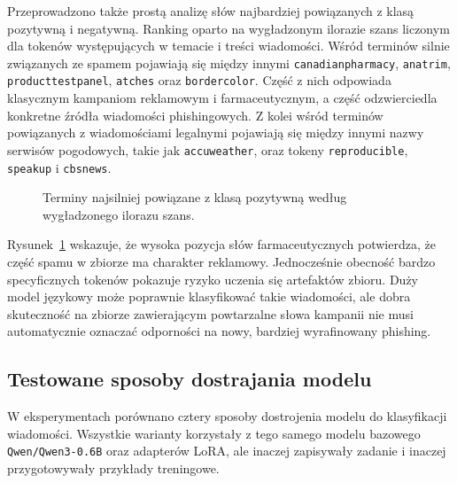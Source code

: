Przeprowadzono także prostą analizę słów najbardziej powiązanych z klasą
pozytywną i negatywną. Ranking oparto na wygładzonym ilorazie szans liczonym
dla tokenów występujących w temacie i treści wiadomości. Wśród terminów silnie
związanych ze spamem pojawiają się między innymi \texttt{canadianpharmacy},
\texttt{anatrim}, \texttt{producttestpanel}, \texttt{atches} oraz
\texttt{bordercolor}. Część z nich odpowiada klasycznym kampaniom reklamowym i
farmaceutycznym, a część odzwierciedla konkretne źródła wiadomości
phishingowych. Z kolei wśród terminów powiązanych z wiadomościami legalnymi
pojawiają się między innymi nazwy serwisów pogodowych, takie jak
\texttt{accuweather}, oraz tokeny \texttt{reproducible}, \texttt{speakup} i
\texttt{cbsnews}.

\begin{figure}[htbp]
\centering

\caption{Terminy najsilniej powiązane z klasą pozytywną według wygładzonego
ilorazu szans.}
\label{fig:spam-associated-terms}
\end{figure}

Rysunek~\ref{fig:spam-associated-terms} wskazuje, że wysoka pozycja słów
farmaceutycznych potwierdza, że część spamu w zbiorze ma charakter reklamowy.
Jednocześnie obecność bardzo specyficznych tokenów pokazuje ryzyko uczenia się
artefaktów zbioru. Duży model językowy może poprawnie klasyfikować takie
wiadomości, ale dobra skuteczność na zbiorze zawierającym powtarzalne słowa
kampanii nie musi automatycznie oznaczać odporności na nowy, bardziej
wyrafinowany phishing.

\subsection{Testowane sposoby dostrajania modelu}

W eksperymentach porównano cztery sposoby dostrojenia modelu do klasyfikacji
wiadomości. Wszystkie warianty korzystały z tego samego modelu bazowego
\texttt{Qwen/Qwen3-0.6B} oraz adapterów LoRA, ale inaczej zapisywały zadanie i
inaczej przygotowywały przykłady treningowe.

